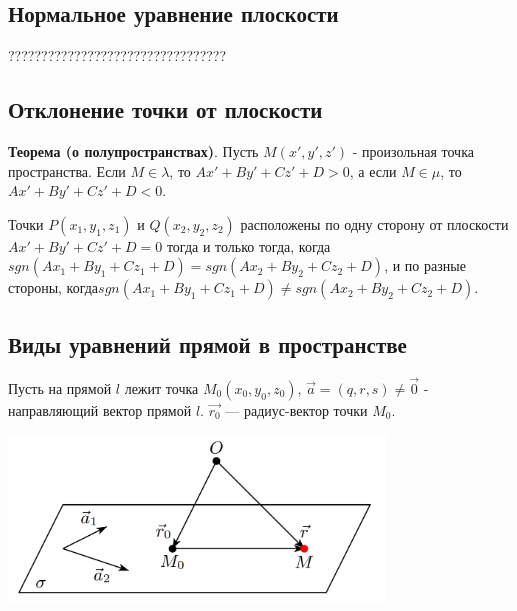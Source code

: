 \documentclass[a4paper]{article}
\begin{document}
    \newpage \begin{center}
                 \begin{Large}
                 \end{Large}
    \end{center}
    \subsection*{Нормальное уравнение плоскости}

    ?????????????????????????????????

    \subsection*{Отклонение точки от плоскости}

    \begin{htheorem}
        \textbf{Теорема (о полупространствах)}. Пусть $M(x', y', z')$ - произольная точка пространства. Если $M \in \lambda$, то $Ax' + By' + Cz' + D > 0$, а если $M \in \mu$, то $Ax' + By' + Cz' + D < 0$.

        Точки $P(x_1, y_1, z_1)$ и $Q(x_2, y_2, z_2)$ расположены по одну сторону от плоскости\newline $Ax' + By' + Cz' + D = 0$ тогда и только тогда, когда\newline $sgn(Ax_1 + By_1 +Cz_1+D) = sgn(Ax_2 + By_2 + Cz_2 + D)$, и по разные стороны, когда\newline $sgn(Ax_1 + By_1 +Cz_1+D) \neq sgn(Ax_2 + By_2 + Cz_2 + D)$.
    \end{htheorem}


    \newpage \begin{center}
                 \begin{Large}
                 \end{Large}
    \end{center}
    \subsection*{Виды уравнений прямой в пространстве}

    Пусть на прямой $l$ лежит точка $M_0(x_0,y_0,z_0)$, $\vec{a} = (q,r,s) \neq \vec{0}$ - направляющий вектор прямой $l$. $\vec{r_0}$ --- радиус-вектор точки $M_0$.

    \includegraphics[width=10cm]{t8}
\end{document}
